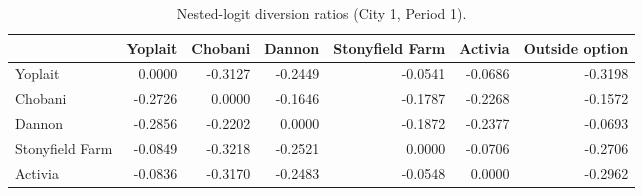 \begin{table}[H]
\centering
\caption{Nested-logit diversion ratios (City 1, Period 1).}
\label{tab:q21_div}
\begin{tabular}{lrrrrrr}
\toprule
 & Yoplait & Chobani & Dannon & Stonyfield Farm & Activia & Outside option \\
\midrule
Yoplait & 0.0000 & -0.3127 & -0.2449 & -0.0541 & -0.0686 & -0.3198 \\
Chobani & -0.2726 & 0.0000 & -0.1646 & -0.1787 & -0.2268 & -0.1572 \\
Dannon & -0.2856 & -0.2202 & 0.0000 & -0.1872 & -0.2377 & -0.0693 \\
Stonyfield Farm & -0.0849 & -0.3218 & -0.2521 & 0.0000 & -0.0706 & -0.2706 \\
Activia & -0.0836 & -0.3170 & -0.2483 & -0.0548 & 0.0000 & -0.2962 \\
\bottomrule
\end{tabular}
\end{table}
